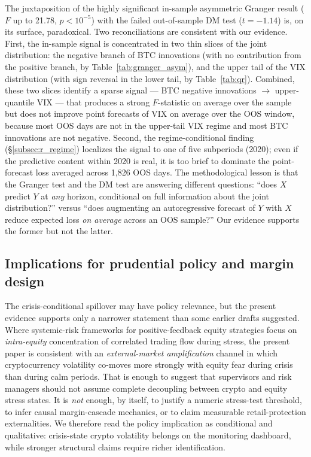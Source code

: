 \documentclass[11pt,a4paper]{article}
\begin{document}
The juxtaposition of the highly significant in-sample asymmetric Granger result ($F$ up to 21.78, $p < 10^{-5}$) with the failed out-of-sample DM test ($t = -1.14$) is, on its surface, paradoxical. Two reconciliations are consistent with our evidence. First, the in-sample signal is concentrated in two thin slices of the joint distribution: the negative branch of BTC innovations (with no contribution from the positive branch, by Table~\ref{tab:granger_asym}), and the upper tail of the VIX distribution (with sign reversal in the lower tail, by Table~\ref{tab:qr}). Combined, these two slices identify a sparse signal --- BTC negative innovations $\to$ upper-quantile VIX --- that produces a strong $F$-statistic on average over the sample but does not improve point forecasts of VIX on average over the OOS window, because most OOS days are not in the upper-tail VIX regime and most BTC innovations are not negative. Second, the regime-conditional finding (\S\ref{subsec:r_regime}) localizes the signal to one of five subperiods (2020); even if the predictive content within 2020 is real, it is too brief to dominate the point-forecast loss averaged across 1{,}826 OOS days. The methodological lesson is that the Granger test and the DM test are answering different questions: ``does $X$ predict $Y$ at \emph{any} horizon, conditional on full information about the joint distribution?'' versus ``does augmenting an autoregressive forecast of $Y$ with $X$ reduce expected loss \emph{on average} across an OOS sample?'' Our evidence supports the former but not the latter.

\subsection{Implications for prudential policy and margin design}
\label{subsec:d_policy}

The crisis-conditional spillover may have policy relevance, but the present evidence supports only a narrower statement than some earlier drafts suggested. Where systemic-risk frameworks for positive-feedback equity strategies focus on \emph{intra-equity} concentration of correlated trading flow during stress, the present paper is consistent with an \emph{external-market amplification} channel in which cryptocurrency volatility co-moves more strongly with equity fear during crisis than during calm periods. That is enough to suggest that supervisors and risk managers should not assume complete decoupling between crypto and equity stress states. It is \emph{not} enough, by itself, to justify a numeric stress-test threshold, to infer causal margin-cascade mechanics, or to claim measurable retail-protection externalities. We therefore read the policy implication as conditional and qualitative: crisis-state crypto volatility belongs on the monitoring dashboard, while stronger structural claims require richer identification.
\end{document}
